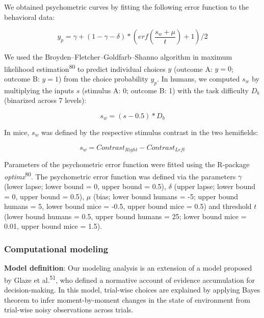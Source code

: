 \documentclass[
]{article}
\begin{document}
We obtained psychometric curves by fitting the following error function
to the behavioral data:

\begin{equation}
y_p = \gamma + (1 - \gamma - \delta) *  (erf(\frac{s_w + \mu}{t}) + 1) / 2
\end{equation}

We used the Broyden--Fletcher--Goldfarb--Shanno algorithm in maximum
likelihood estimation\textsuperscript{80} to predict individual choices
\(y\) (outcome A: \(y = 0\); outcome B: \(y = 1\)) from the choice
probability \(y_p\). In humans, we computed \(s_w\) by multiplying the
inputs \(s\) (stimulus A: 0; outcome B: 1) with the task difficulty
\(D_b\) (binarized across 7 levels):

\begin{equation}
s_w = (s - 0.5) * D_b
\end{equation}

In mice, \(s_w\) was defined by the respective stimulus contrast in the
two hemifields:

\begin{equation}
s_w = Contrast_{Right} - Contrast_{Left}
\end{equation}

Parameters of the psychometric error function were fitted using the
R-package \emph{optimx}\textsuperscript{80}. The psychometric error
function was defined via the parameters \(\gamma\) (lower lapse; lower
bound = 0, upper bound = 0.5), \(\delta\) (upper lapse; lower bound = 0,
upper bound = 0.5), \(\mu\) (bias; lower bound humans = -5; upper bound
humans = 5, lower bound mice = -0.5, upper bound mice = 0.5) and
threshold \(t\) (lower bound humans = 0.5, upper bound humans = 25;
lower bound mice = 0.01, upper bound mice = 1.5).

\hypertarget{computational-modeling}{%
\subsubsection{Computational modeling}\label{computational-modeling}}

\textbf{Model definition}: Our modeling analysis is an extension of a
model proposed by Glaze et al.\textsuperscript{51}, who defined a
normative account of evidence accumulation for decision-making. In this
model, trial-wise choices are explained by applying Bayes theorem to
infer moment-by-moment changes in the state of environment from
trial-wise noisy observations across trials.
\end{document}
